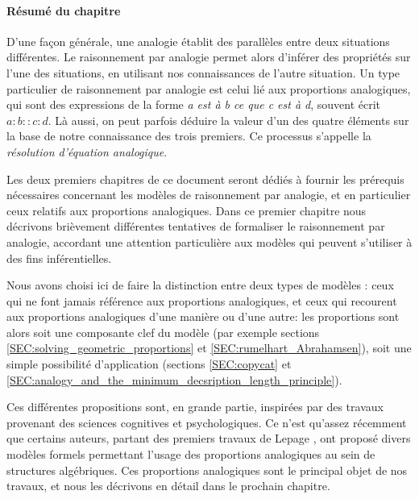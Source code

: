 \paragraph{Résumé du chapitre}

D'une façon générale, une analogie établit des parallèles entre deux situations
différentes. Le raisonnement par analogie permet alors d'inférer des propriétés
sur l'une des situations, en utilisant nos connaissances de l'autre situation.
Un type particulier de raisonnement par analogie est celui lié aux proportions
analogiques, qui sont des expressions de la forme \textit{a est à b ce que c
est à d}, souvent écrit $a:b::c:d$. Là aussi, on peut parfois déduire la valeur
d'un des quatre éléments sur la base de notre connaissance des trois premiers.
Ce processus s'appelle la \textit{résolution d'équation analogique}.

Les deux premiers chapitres de ce document seront dédiés à fournir les
prérequis nécessaires concernant les modèles de raisonnement par analogie, et
en particulier ceux relatifs aux proportions analogiques. Dans ce premier
chapitre nous décrivons brièvement différentes tentatives de formaliser le
raisonnement par analogie, accordant une attention particulière aux modèles qui
peuvent s'utiliser à des fins inférentielles.

Nous avons choisi ici de faire la distinction entre deux types de modèles :
ceux qui ne font jamais référence aux proportions analogiques, et ceux qui
recourent aux proportions analogiques d'une manière ou d'une autre: les
proportions sont alors soit une composante clef du modèle (par exemple sections
\ref{SEC:solving_geometric_proportions} et \ref{SEC:rumelhart_Abrahamsen}),
soit une simple possibilité d'application (sections \ref{SEC:copycat} et
\ref{SEC:analogy_and_the_minimum_decsription_length_principle}).

Ces différentes propositions sont, en grande partie, inspirées par des travaux
provenant des sciences cognitives et psychologiques. Ce n'est qu'assez
récemment que certains auteurs, partant des premiers travaux de Lepage
\cite{Lep04}, ont proposé divers modèles formels permettant l'usage des
proportions analogiques au sein de structures algébriques. Ces
proportions analogiques sont le principal objet de nos travaux, et nous les
décrivons en détail dans le prochain chapitre.
